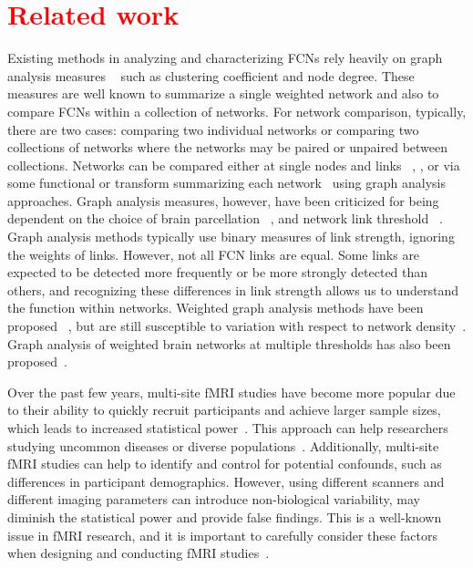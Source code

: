 \section{\textcolor{red}{Related work}}
\label{sec:rw}


Existing methods in analyzing and characterizing FCNs rely heavily on graph analysis measures ~\cite{10.3389/fncom.2014.00051, TERMENON2016172, Aurich2015, ANDELLINI2015183} such as clustering coefficient and node degree. These measures are well known to summarize a single weighted network and also to compare FCNs within a collection of networks. For network comparison, typically, there are two cases: comparing two individual networks or comparing two collections of networks where the networks may be paired or unpaired between collections. Networks can be compared either at single nodes and links ~\cite{10.3389/fncom.2014.00051}, \cite{7270846}, or via some functional or transform summarizing each network~\cite{Simpson2013} using graph analysis approaches. Graph analysis measures, however, have been criticized for being dependent on the choice of brain parcellation ~\cite{Hilgetag2016, 10.3389/fnhum.2016.00096}, and network link threshold ~\cite{GARRISON2015651}. Graph analysis methods typically use binary measures of link strength, ignoring the weights of links. However, not all FCN links are equal. Some links are expected to be detected more frequently or be more strongly detected than others, and recognizing these differences in link strength allows us to understand the function within networks. Weighted graph analysis methods have been proposed ~\cite{RUBINOV20101059}, but are still susceptible to variation with respect to network density~\cite{10.3389/fncom.2014.00051}. Graph analysis of weighted brain networks at multiple thresholds has also been proposed~\cite{DRAKESMITH2015313}.


Over the past few years, multi-site fMRI studies have become more popular due to their ability to quickly recruit participants and achieve larger sample sizes, which leads to increased statistical power~\cite{noble2017multisite}. This approach can help researchers studying uncommon diseases or diverse populations~\cite{dansereau2017statistical}. Additionally, multi-site fMRI studies can help to identify and control for potential confounds, such as differences in participant demographics. However, using different scanners and different imaging parameters can introduce non-biological variability, may diminish the statistical power and provide false findings. This is a well-known issue in fMRI research, and it is important to carefully consider these factors when designing and conducting fMRI studies~\cite{shinohara2017volumetric}.

